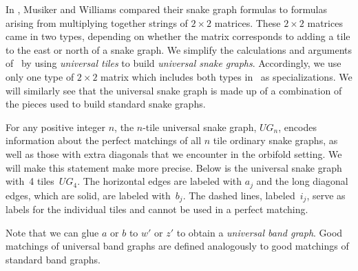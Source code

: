 \documentclass[pdftex]{sigma}%
\numberwithin{equation}{section}
\begin{document}
In \cite{MW}, Musiker and Williams compared their snake graph formulas to formulas arising from multiplying together strings of $2 \times 2$ matrices. These $2 \times 2$ matrices came in two types, depending on whether the matrix corresponds to adding a tile to the east or north of a snake graph. We simplify the calculations and arguments of~\cite{MW} by using \emph{universal tiles} to build \emph{universal snake graphs}. Accordingly, we use only one type of $2 \times 2$ matrix which includes both types in~\cite{MW} as specializations. We will similarly see that the universal snake graph is made up of a combination of the pieces used to build standard snake graphs.

For any positive integer $n$, the $n$-tile universal snake graph, $UG_n$, encodes information about the perfect matchings of all $n$ tile ordinary snake graphs, as well as those with extra diagonals that we encounter in the orbifold setting. We will make this statement make more precise. Below is the universal snake graph with~4 tiles~$UG_4$. The horizontal edges are labeled with $a_j$ and the long diagonal edges, which are solid, are labeled with~$b_j$. The dashed lines, labeled~$i_j$, serve as labels for the individual tiles and cannot be used in a perfect mat\-ching.

\begin{center}
\end{center}

Note that we can glue $a$ or $b$ to $w'$ or $z'$ to obtain a \emph{universal band graph}. Good matchings of universal band graphs are defined analogously to good matchings of standard band graphs.
\end{document}
